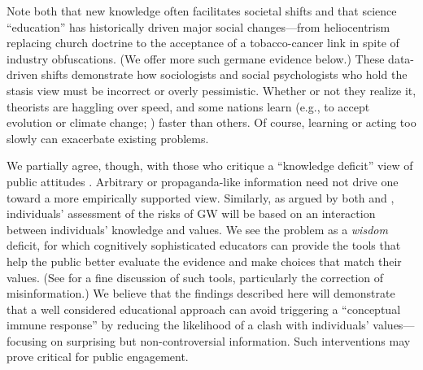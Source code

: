 Note both that new knowledge often facilitates societal shifts and that science
``education'' has historically driven major social changes—from heliocentrism
replacing church doctrine to the acceptance of a tobacco-cancer link in spite of
industry obfuscations. (We offer more such germane evidence below.) These
data-driven shifts demonstrate how sociologists and social psychologists who
hold the stasis view must be incorrect or overly pessimistic. Whether or not
they realize it, theorists are haggling over speed, and some nations learn
(e.g., to accept evolution or climate change; ) faster than others.
Of course, learning or acting too slowly can exacerbate existing problems.

We partially agree, though, with those who critique a ``knowledge deficit'' view
of public attitudes \parencite[cf.][]{dickson_case_2005}. Arbitrary or
propaganda-like information need not drive one toward a more empirically
supported view. Similarly, as argued by both \textcite{kahan_polarizing_2012}
and \textcite{ranney_why_2012}, individuals' assessment of the risks of GW will
be based on an interaction between individuals' knowledge and values. We see the
problem as a \emph{wisdom} deficit, for which cognitively sophisticated
educators can provide the tools that help the public better evaluate the
evidence and make choices that match their values. (See
 for a fine discussion of such
tools, particularly the correction of misinformation.) We believe that the
findings described here will demonstrate that a well considered educational
approach can avoid triggering a “conceptual immune response” by reducing the
likelihood of a clash with individuals' values---focusing on surprising but
non-controversial information. Such interventions may prove critical for public
engagement.


